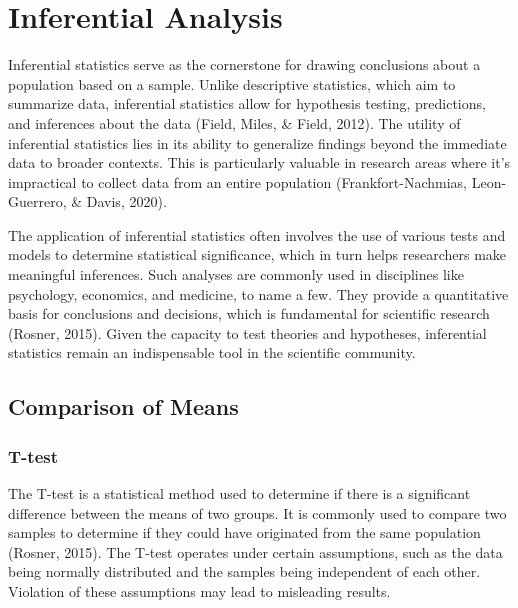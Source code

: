 \documentclass[
  b5paper]{book}
\begin{document}
\hypertarget{inferential-analysis-1}{%
\section{Inferential Analysis}\label{inferential-analysis-1}}

Inferential statistics serve as the cornerstone for drawing conclusions about a population based on a sample. Unlike descriptive statistics, which aim to summarize data, inferential statistics allow for hypothesis testing, predictions, and inferences about the data (Field, Miles, \& Field, 2012). The utility of inferential statistics lies in its ability to generalize findings beyond the immediate data to broader contexts. This is particularly valuable in research areas where it's impractical to collect data from an entire population (Frankfort-Nachmias, Leon-Guerrero, \& Davis, 2020).

The application of inferential statistics often involves the use of various tests and models to determine statistical significance, which in turn helps researchers make meaningful inferences. Such analyses are commonly used in disciplines like psychology, economics, and medicine, to name a few. They provide a quantitative basis for conclusions and decisions, which is fundamental for scientific research (Rosner, 2015). Given the capacity to test theories and hypotheses, inferential statistics remain an indispensable tool in the scientific community.

\hypertarget{comparison-of-means}{%
\subsection*{Comparison of Means}\label{comparison-of-means}}

\hypertarget{t-test}{%
\subsubsection*{T-test}\label{t-test}}

The T-test is a statistical method used to determine if there is a significant difference between the means of two groups. It is commonly used to compare two samples to determine if they could have originated from the same population (Rosner, 2015). The T-test operates under certain assumptions, such as the data being normally distributed and the samples being independent of each other. Violation of these assumptions may lead to misleading results.
\end{document}
